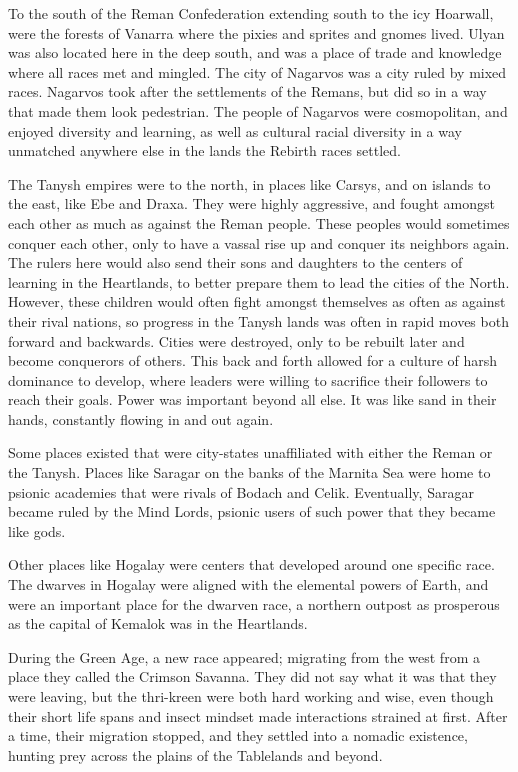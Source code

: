 To the south of the Reman Confederation extending south to the icy Hoarwall, were the forests of Vanarra where the pixies and sprites and gnomes lived. Ulyan was also located here in the deep south, and was a place of trade and knowledge where all races met and mingled. The city of Nagarvos was a city ruled by mixed races. Nagarvos took after the settlements of the Remans, but did so in a way that made them look pedestrian. The people of Nagarvos were cosmopolitan, and enjoyed diversity and learning, as well as cultural racial diversity in a way unmatched anywhere else in the lands the Rebirth races settled.

The Tanysh empires were to the north, in places like Carsys, and on islands to the east, like Ebe and Draxa. They were highly aggressive, and fought amongst each other as much as against the Reman people. These peoples would sometimes conquer each other, only to have a vassal rise up and conquer its neighbors again. The rulers here would also send their sons and daughters to the centers of learning in the Heartlands, to better prepare them to lead the cities of the North. However, these children would often fight amongst themselves as often as against their rival nations, so progress in the Tanysh lands was often in rapid moves both forward and backwards. Cities were destroyed, only to be rebuilt later and become conquerors of others. This back and forth allowed for a culture of harsh dominance to develop, where leaders were willing to sacrifice their followers to reach their goals. Power was important beyond all else. It was like sand in their hands, constantly flowing in and out again.

Some places existed that were city-states unaffiliated with either the Reman or the Tanysh. Places like Saragar on the banks of the Marnita Sea were home to psionic academies that were rivals of Bodach and Celik. Eventually, Saragar became ruled by the Mind Lords, psionic users of such power that they became like gods.

Other places like Hogalay were centers that developed around one specific race. The dwarves in Hogalay were aligned with the elemental powers of Earth, and were an important place for the dwarven race, a northern outpost as prosperous as the capital of Kemalok was in the Heartlands.

During the Green Age, a new race appeared; migrating from the west from a place they called the Crimson Savanna. They did not say what it was that they were leaving, but the thri-kreen were both hard working and wise, even though their short life spans and insect mindset made interactions strained at first. After a time, their migration stopped, and they settled into a nomadic existence, hunting prey across the plains of the Tablelands and beyond.

